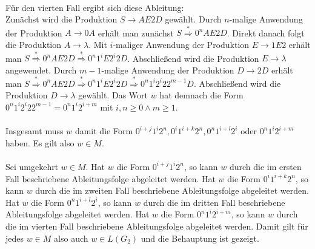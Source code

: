 \documentclass[10pt,a4paper,oneside,ngerman,numbers=noenddot]{scrartcl}
\begin{document}
\\
Für den vierten Fall ergibt sich diese Ableitung:\\
Zunächst wird die Produktion $S \rightarrow AE2D$ gewählt. Durch $n$-malige Anwendung der Produktion $A \rightarrow 0A$ erhält man zunächst $S \overset{*}{\Longrightarrow} 0^{n}AE2D$. Direkt danach folgt die Produktion $A \rightarrow \lambda$. Mit $i$-maliger Anwendung der Produktion  $E \rightarrow 1E2$ erhält man $S \overset{*}{\Longrightarrow} 0^{n}AE2D \overset{*}{\Longrightarrow} 0^{n}1^{i}E2^{i}2D$. Abschließend wird die Produktion $E \rightarrow \lambda$ angewendet. Durch $m-1$-malige Anwendung der Produktion $D \rightarrow 2D$ erhält man $S \overset{*}{\Longrightarrow} 0^{n}AE2D \overset{*}{\Longrightarrow} 0^{n}1^{i}E2^{i}2D \overset{*}{\Longrightarrow} 0^{n}1^{i}2^{i}22^{m-1}D$. Abschließend wird die Produktion $D \rightarrow \lambda$ gewählt. Das Wort $w$ hat demnach die Form $0^{n}1^{i}2^{i}22^{m-1} = 0^{n}1^{i}2^{i + m}$ mit $i,n \geq 0 \wedge m \geq 1$. \\
\\
Insgesamt muss $w$ damit die Form $0^{i + j}1^{i}2^{n}, 0^{i}1^{i + k}2^{n}, 0^{n}1^{i + l}2^{i}$ oder $0^{n}1^{i}2^{i + m}$ haben. Es gilt also $w \in M$.\\
\\
Sei umgekehrt $w \in M$. Hat $w$ die Form $0^{i + j}1^{i}2^{n}$, so kann $w$ durch die im ersten Fall beschriebene Ableitungsfolge abgeleitet werden. Hat $w$ die Form $0^{i}1^{i + k}2^{n}$, so kann $w$ durch die im zweiten Fall beschriebene Ableitungsfolge abgeleitet werden. Hat $w$ die Form $0^{n}1^{i + l}2^{i}$, so kann $w$ durch die im dritten Fall beschriebene Ableitungsfolge abgeleitet werden. Hat $w$ die Form $0^{n}1^{i}2^{i + m}$, so kann $w$ durch die im vierten Fall beschriebene Ableitungsfolge abgeleitet werden. Damit gilt für jedes $w \in M$ also auch $w \in L(G_{2})$ und die Behauptung ist gezeigt.
\end{document}
